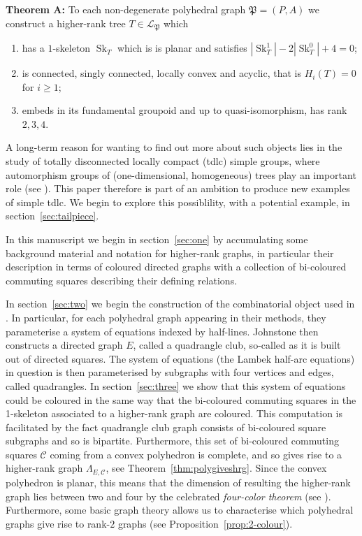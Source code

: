 \documentclass[12pt]{amsart}
\theoremstyle{definition}
\theoremstyle{remark}
\numberwithin{equation}{section}
\newcommand{\Sk}{\operatorname{Sk}}
\begin{document}
\noindent
\textbf{Theorem A:} To each non-degenerate polyhedral graph $\mathfrak{P}=(P,A)$ we construct a higher-rank tree $T \in \mathcal{L}_{\mathfrak{P}}$ which
\begin{enumerate}[leftmargin=0.5cm]
\item[$\bullet$] has a $1$-skeleton $\Sk_T$ which is is planar and  satisfies $| \Sk_T^1 | - 2 | \Sk_T^0 | +4 = 0$;
\item[$\bullet$] is connected, singly connected, locally convex and acyclic, that is $H_i (T)=0$ for $i \ge 1$;
\item[$\bullet$] embeds in its fundamental groupoid and up to quasi-isomorphism, has rank $2,3,4$.
\end{enumerate}

A long-term reason for wanting to find out more about such objects lies in the study of totally disconnected locally compact (tdlc)  simple groups, where automorphism groups of (one-dimensional, homogeneous) trees play an important role (see \cite[\S 3]{W}). This paper therefore is part of an ambition to produce new examples of simple tdlc. We begin to explore this  possiblility, with a potential example, in section~\ref{sec:tailpiece}.

In this manuscript we begin in section~\ref{sec:one} by accumulating some background material and notation  for higher-rank graphs, in particular their description in terms of coloured directed graphs with a collection of bi-coloured commuting squares describing their defining relations.

In section~\ref{sec:two} we begin the construction of the combinatorial object used in \cite{Lambek,Johnstone}. In particular, for each polyhedral graph appearing in their methods, they parameterise a system of equations indexed by half-lines. Johnstone then constructs a directed graph $E$, called a quadrangle club, so-called  as it is built out of directed squares. The system of equations (the Lambek half-arc equations) in question is then parameterised by subgraphs with four vertices and edges, called quadrangles.  In section~\ref{sec:three} we show that this system of equations could be coloured in the same way that the bi-coloured commuting squares in the 1-skeleton associated to a higher-rank graph are coloured. This computation is facilitated by the fact  quadrangle club graph consists of bi-coloured square subgraphs and so is bipartite. Furthermore, this set of bi-coloured commuting squares $\mathcal{C}$ coming from a convex polyhedron is complete, and so gives rise to a higher-rank graph $\Lambda_{E,\mathcal{C}}$, see Theorem~\ref{thm:polygiveshrg}. Since the convex polyhedron is planar, this means that the dimension of resulting the higher-rank graph lies between two and four by the celebrated \emph{four-color theorem} (see \cite{AH1,AHK,AH2}). Furthermore, some basic graph theory allows us to characterise which polyhedral graphs give rise to rank-$2$ graphs (see Proposition~\ref{prop:2-colour}).
\end{document}
